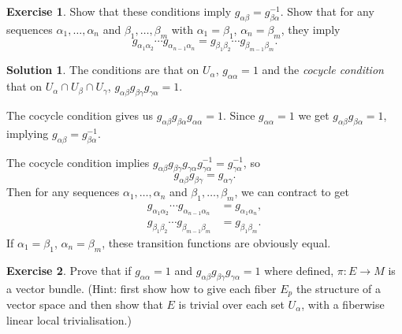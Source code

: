 \documentclass[11pt, a4paper]{report}
\theoremstyle{definition}
\newtheorem{exercise}{Exercise}[part]
\newtheorem{solution}{Solution}[part]
\newenvironment{ex}{\begin{exercise}}{\end{exercise}\pagebreak[1]}
\newenvironment{sol}{\begin{solution}}{\end{solution}\pagebreak[3]}
\begin{document}
\begin{ex}

Show that these conditions imply $g_{\alpha\beta} = g^{-1}_{\beta\alpha}$.
Show that for any sequences $\alpha_1, \ldots, \alpha_n$ and $\beta_1, \ldots, \beta_m$ with $\alpha_1 = \beta_1$, $\alpha_n = \beta_m$, they imply
\[
    g_{\alpha_1 \alpha_2} \cdots g_{\alpha_{n - 1} \alpha_n}
        = g_{\beta_1 \beta_2} \cdots g_{\beta_{m - 1} \beta_m}.
\]

\end{ex}

\begin{sol}

The conditions are that on $U_\alpha$, $g_{\alpha \alpha} = 1$ and the \emph{cocycle condition} that on $U_\alpha \cap U_\beta \cap U_\gamma$, $g_{\alpha\beta} g_{\beta\gamma} g_{\gamma\alpha} = 1$.

The cocycle condition gives us $g_{\alpha\beta} g_{\beta\alpha} g_{\alpha\alpha} = 1$. Since $g_{\alpha\alpha} = 1$ we get $g_{\alpha\beta} g_{\beta\alpha} = 1$, implying $g_{\alpha\beta} = g^{-1}_{\beta\alpha}$.

The cocycle condition implies $g_{\alpha\beta} g_{\beta\gamma} g_{\gamma\alpha} g^{-1}_{\gamma\alpha} = g^{-1}_{\gamma\alpha}$, so
\[
    g_{\alpha\beta} g_{\beta\gamma} = g_{\alpha\gamma}.
\]
Then for any sequences $\alpha_1, \ldots, \alpha_n$ and $\beta_1, \ldots, \beta_m$, we can contract to get
\begin{align*}
    g_{\alpha_1 \alpha_2} \cdots g_{\alpha_{n - 1} \alpha_n} &= g_{\alpha_1 \alpha_n}, \\
    g_{\beta_1 \beta_2} \cdots g_{\beta_{m - 1} \beta_m} &= g_{\beta_1 \beta_m}.
\end{align*}
If $\alpha_1 = \beta_1$, $\alpha_n = \beta_m$, these transition functions are obviously equal.

\end{sol}

\begin{ex}

Prove that if $g_{\alpha\alpha} = 1$ and $g_{\alpha\beta} g_{\beta\gamma} g_{\gamma\alpha} = 1$ where defined, $\pi: E \to M$ is a vector bundle.
(Hint: first show how to give each fiber $E_p$ the structure of a vector space and then show that $E$ is trivial over each set $U_\alpha$, with a fiberwise linear local trivialisation.)

\end{ex}
\end{document}
